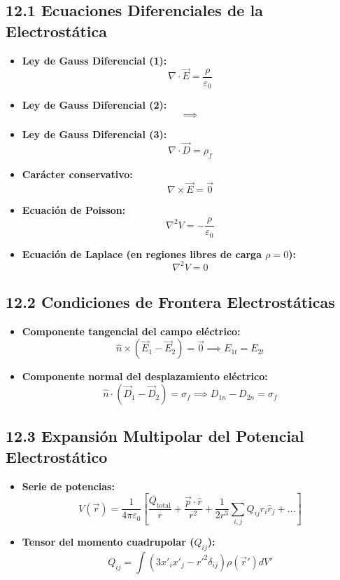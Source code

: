 \documentclass[11pt,a4paper]{article}
\begin{document}
\subsection*{12.1 Ecuaciones Diferenciales de la Electrostática}

\begin{itemize}
  \item \textbf{Ley de Gauss Diferencial (1):}
  \[
    \nabla \cdot \vec{E} = \frac{\rho}{\varepsilon_0}
  \]
  \item \textbf{Ley de Gauss Diferencial (2):}
  \[
    \implies
  \]
  \item \textbf{Ley de Gauss Diferencial (3):}
  \[
    \nabla \cdot \vec{D} = \rho_f
  \]
  \item \textbf{Carácter conservativo:}
  \[
    \nabla \times \vec{E} = \vec{0}
  \]
  \item \textbf{Ecuación de Poisson:}
  \[
    \nabla^2 V = -\frac{\rho}{\varepsilon_0}
  \]
  \item \textbf{Ecuación de Laplace (en regiones libres de carga $\rho = 0$):}
  \[
    \nabla^2 V = 0
  \]
\end{itemize}

\subsection*{12.2 Condiciones de Frontera Electrostáticas}

\begin{itemize}
  \item \textbf{Componente tangencial del campo eléctrico:}
  \[
    \hat{n} \times (\vec{E}_1 - \vec{E}_2) = \vec{0} \implies E_{1t} = E_{2t}
  \]
  \item \textbf{Componente normal del desplazamiento eléctrico:}
  \[
    \hat{n} \cdot (\vec{D}_1 - \vec{D}_2) = \sigma_f \implies D_{1n} - D_{2n} = \sigma_f
  \]
\end{itemize}

\subsection*{12.3 Expansión Multipolar del Potencial Electrostático}

\begin{itemize}
  \item \textbf{Serie de potencias:}
  \[
    V(\vec{r}) = \frac{1}{4\pi\varepsilon_0} \left[ \frac{Q_{\text{total}}}{r} + \frac{\vec{p} \cdot \hat{r}}{r^2} + \frac{1}{2 r^3} \sum_{i,j} Q_{ij} \hat{r}_i \hat{r}_j + \dots \right]
  \]
  \item \textbf{Tensor del momento cuadrupolar ($Q_{ij}$):}
  \[
    Q_{ij} = \int (3 x'_i x'_j - r'^2 \delta_{ij}) \rho(\vec{r}') dV'
  \]
\end{itemize}
\end{document}
